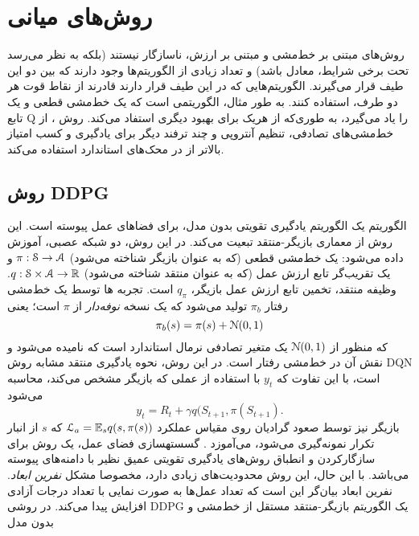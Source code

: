 \section{روش‌های میانی}
روش‌های مبتنی بر خط‌مشی و مبتنی بر ارزش،
ناسازگار نیستند (بلکه به نظر می‌رسد تحت برخی شرایط، معادل باشد) و تعداد زیادی از الگوریتم‌ها وجود دارند که بین دو  این طیف قرار می‌گیرند. الگوریتم‌هایی که در این طیف قرار دارند قادرند از نقاط قوت  هر دو طرف، استفاده کنند.
به طور مثال، 
الگوریتمی است که  یک خط‌مشی قطعی و یک تابع Q را یاد می‌گیرد،
به ‌طوری‌که از هریک  برای بهبود دیگری استفاد می‌کند. روش
،
از خط‌مشی‌های تصادفی، تنظیم آنتروپی  و چند ترفند دیگر برای  یادگیری و کسب امتیاز بالاتر از 
در محک‌های استاندارد
استفاده می‌کند.
\subsection{روش DDPG}
الگوریتم 
\textit{}
یک الگوریتم یادگیری تقویتی بدون مدل، برای فضاهای عمل پیوسته است. این روش از معماری بازیگر-منتقد تبعیت می‌کند. در این روش، دو شبکه عصبی،  آموزش داده می‌شود: یک خط‌مشی قطعی (که به عنوان بازیگر شناخته می‌شود)
$\pi:\EuScript{S} \to \EuScript{A}$
و یک تقریب‌گر تابع ارزش عمل (که به عنوان منتقد شناخته می‌شود)
$q: \EuScript{S} \times \EuScript{A} \to \mathbb{R}$.
وظیفه منتقد، تخمین تابع ارزش عمل بازیگر،
$q_\pi$
است.
تجربه ها توسط یک خط‌مشی رفتار $\pi_b$ تولید می‌شود که یک نسخه 
\textit{{نوفه‌دار}}
از $\pi$ است؛ یعنی
$$\pi_b(s) = \pi(s) + \EuScript{N}(0,1)$$
که منظور از
$\EuScript{N}(0,1)$
یک متغیر تصادفی نرمال استاندارد است که 
\textit{}
نامیده می‌شود و نقش آن  در خط‌مشی رفتار است.
در این روش، نحوه یادگیری منتقد مشابه روش DQN است، با این تفاوت که $y_t$ با استفاده از عملی که بازیگر مشخص می‌کند، محاسبه می‌شود
$$y_t = R_t + \gamma q(S_{t+1},\pi(S_{t+1}).$$
بازیگر نیز توسط صعود گرادیان روی مقیاس عملکرد
$\EuScript{L}_a = \mathbb{E}_s q(s, \pi(s))$
که $s$ از انبار تکرار نمونه‌گیری می‌شود، می‌آموزد
\cite{andrychowicz2017hindsight}.
گسسته\nf سازی فضای عمل، یک روش برای سازگار‌کردن و انطباق روش‌های یادگیری تقویتی عمیق نظیر 
با دامنه‌های پیوسته می‌باشد. با این حال، این روش محدودیت‌های زیادی دارد، مخصوصا مشکل 
\textit{نفرین ابعاد}.
 نفرین ابعاد بیان‌گر این است که تعداد عمل‌ها به صورت نمایی با تعداد درجات آزادی افزایش پیدا می‌کند. 
در روشی DDPG یک الگوریتم بازیگر-منتقد مستقل از خط‌مشی و بدون مدل
